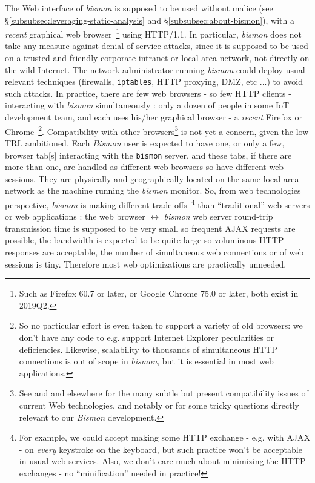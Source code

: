 The Web interface  of \emph{bismon} is supposed
to be used without malice (see
§\ref{subsubsec:leveraging-static-analysis} and
§\ref{subsubsec:about-bismon}), with a \emph{recent} graphical web
browser~\footnote{Such as Firefox 60.7 or later, or Google Chrome 75.0
  or later, both exist in 2019Q2.}  using HTTP/1.1. In particular,
\emph{bismon} does not take any measure against
 denial-of-service attacks, since it is
supposed to be used on a trusted and friendly corporate intranet or
local area network, not directly on the wild Internet. The network
administrator running \emph{bismon} could deploy usual relevant
techniques (firewalls, \texttt{iptables}, HTTP proxying, DMZ, etc ...)
to avoid such attacks. In practice, there are few web browsers - so
few HTTP clients - interacting with \emph{bismon} simultaneously :
only a dozen of people in some IoT development team, and each uses
his/her graphical browser  - a \emph{recent} Firefox or
Chrome~\footnote{So no particular effort is even taken to support a
  variety of old browsers: we don't have any code to e.g. support
  Internet Explorer pecularities or deficiencies. Likewise,
  scalability to thousands of simultaneous HTTP connections is out of
  scope in \emph{bismon}, but it is essential in most web
  applications.}. Compatibility with other browsers\footnote{See
   and
   and elsewhere for the many
  subtle but present compatibility issues of current Web technologies,
  and notably  or
  for some tricky questions directly relevant to our \emph{Bismon}
  development.} is not yet a concern, given the low TRL
ambitioned. Each \emph{Bismon} user is expected to have one, or only a
few, browser tab[s] interacting with the \texttt{bismon} server, and
these tabs, if there are more than one, are handled as different web
browsers so have different web sessions.  They are physically and
geographically located on the same local area network as the machine
running the \emph{bismon} monitor. So, from web technologies
perspective, \emph{bismon} is making different
trade-offs~\footnote{For example, we could accept making some HTTP
  exchange - e.g. with AJAX - on \emph{every} keystroke on the
  keyboard, but such practice won't be acceptable in usual web
  services. Also, we don't care much about minimizing the HTTP
  exchanges - no ``minification'' needed in practice!} than
``traditional'' web servers or web applications : the web browser
$\leftrightarrow$ \emph{bismon} web server round-trip transmission
time is supposed to be very small so frequent AJAX requests are
possible, the bandwidth is expected to be quite large so voluminous
HTTP responses are acceptable, the number of simultaneous web
connections or of web sessions is tiny. Therefore most web
optimizations are practically unneeded.

